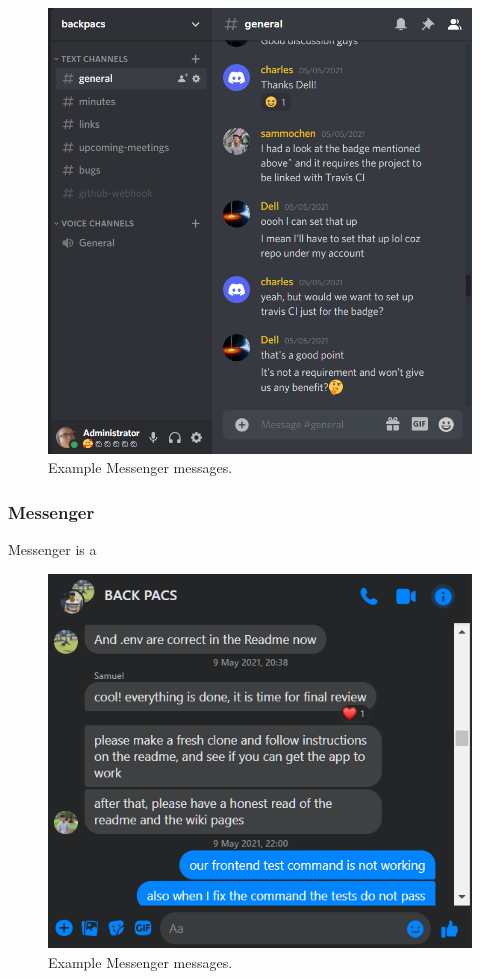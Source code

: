 \documentclass[conference]{IEEEtran}
\begin{document}
\begin{figure}[htbp]
\centerline{\includegraphics[width = \linewidth]{discord.png}}
\caption{Example Messenger messages.}
\label{fig}
\end{figure}
\subsubsection{Messenger}
Messenger is a 

\begin{figure}[htbp]
\centerline{\includegraphics[width = \linewidth]{messenger.png}}
\caption{Example Messenger messages.}
\label{fig}
\end{figure}
\end{document}
